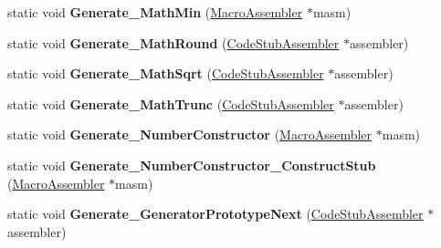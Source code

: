 \begin{DoxyCompactItemize}
\item 
static void {\bfseries Generate\+\_\+\+Math\+Min} (\hyperlink{classv8_1_1internal_1_1_macro_assembler}{Macro\+Assembler} $\ast$masm)\hypertarget{classv8_1_1internal_1_1_builtins_a3c064806dc2b8dd367cee99bd2a78326}{}\label{classv8_1_1internal_1_1_builtins_a3c064806dc2b8dd367cee99bd2a78326}

\item 
static void {\bfseries Generate\+\_\+\+Math\+Round} (\hyperlink{classv8_1_1internal_1_1_code_stub_assembler}{Code\+Stub\+Assembler} $\ast$assembler)\hypertarget{classv8_1_1internal_1_1_builtins_a10020ae8894a4a194b49660731a093b4}{}\label{classv8_1_1internal_1_1_builtins_a10020ae8894a4a194b49660731a093b4}

\item 
static void {\bfseries Generate\+\_\+\+Math\+Sqrt} (\hyperlink{classv8_1_1internal_1_1_code_stub_assembler}{Code\+Stub\+Assembler} $\ast$assembler)\hypertarget{classv8_1_1internal_1_1_builtins_ae7337b9b8567070a21e7151ebf102b22}{}\label{classv8_1_1internal_1_1_builtins_ae7337b9b8567070a21e7151ebf102b22}

\item 
static void {\bfseries Generate\+\_\+\+Math\+Trunc} (\hyperlink{classv8_1_1internal_1_1_code_stub_assembler}{Code\+Stub\+Assembler} $\ast$assembler)\hypertarget{classv8_1_1internal_1_1_builtins_ac34f1de5239a90f21a3c52997117ab5a}{}\label{classv8_1_1internal_1_1_builtins_ac34f1de5239a90f21a3c52997117ab5a}

\item 
static void {\bfseries Generate\+\_\+\+Number\+Constructor} (\hyperlink{classv8_1_1internal_1_1_macro_assembler}{Macro\+Assembler} $\ast$masm)\hypertarget{classv8_1_1internal_1_1_builtins_aa9dab306f0a66ac756723d889f072819}{}\label{classv8_1_1internal_1_1_builtins_aa9dab306f0a66ac756723d889f072819}

\item 
static void {\bfseries Generate\+\_\+\+Number\+Constructor\+\_\+\+Construct\+Stub} (\hyperlink{classv8_1_1internal_1_1_macro_assembler}{Macro\+Assembler} $\ast$masm)\hypertarget{classv8_1_1internal_1_1_builtins_a754797e4b3a13afb4ac896749cd459b0}{}\label{classv8_1_1internal_1_1_builtins_a754797e4b3a13afb4ac896749cd459b0}

\item 
static void {\bfseries Generate\+\_\+\+Generator\+Prototype\+Next} (\hyperlink{classv8_1_1internal_1_1_code_stub_assembler}{Code\+Stub\+Assembler} $\ast$assembler)\hypertarget{classv8_1_1internal_1_1_builtins_aa3840b1ed8b96b417759935b8e610991}{}\label{classv8_1_1internal_1_1_builtins_aa3840b1ed8b96b417759935b8e610991}


\end{DoxyCompactItemize}
